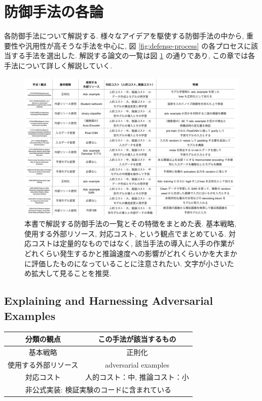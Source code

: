 \section{防御手法の各論}
\label{sec:defenses}
各防御手法について解説する.
様々なアイデアを駆使する防御手法の中から, 重要性や汎用性が高そうな手法を中心に, 図 \ref{fig:defense-process} の各プロセスに該当する手法を選出した.
解説する論文の一覧は図 \ref{fig:defense-summary-table} の通りであり, この章では各手法について詳しく解説していく.
%
\begin{figure}[htbp]
\begin{center}
\includegraphics[width=16.0cm]{figures/defense-summary-table.pdf}
\end{center}
\caption{
本書で解説する防御手法の一覧とその特徴をまとめた表.
基本戦略, 使用する外部リソース, 対応コスト, という観点でまとめている.
対応コストは定量的なものではなく, 該当手法の導入に人手の作業がどれくらい発生するかと推論速度への影響がどれくらいかを大まかに評価したものになっていることに注意されたい.
文字が小さいため拡大して見ることを推奨.
}
\label{fig:defense-summary-table}
\end{figure}
%



\subsection{Explaining and Harnessing Adversarial Examples}
\label{subsec:explaining-and}
%
\begin{table}[htbp]
\begin{center}
\begin{tabular}{|c|c|}
\hline
分類の観点 & この手法が該当するもの \\
\hline
基本戦略 & 正則化 \\
使用する外部リソース & adversarial examples \\
対応コスト & 人的コスト：中, 推論コスト：小 \\
\hline
\multicolumn{2}{|c|}{非公式実装: 検証実験のコードに含まれている} \\
\hline
\end{tabular}
\label{tb:explaining-and-summary}
\end{center}
\end{table}
%

